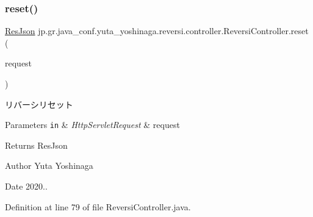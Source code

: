 \subsubsection{\texorpdfstring{reset()}{reset()}}
{\footnotesize\ttfamily \hyperlink{classjp_1_1gr_1_1java__conf_1_1yuta__yoshinaga_1_1reversi_1_1model_1_1_res_json}{Res\+Json} jp.\+gr.\+java\+\_\+conf.\+yuta\+\_\+yoshinaga.\+reversi.\+controller.\+Reversi\+Controller.\+reset (\begin{DoxyParamCaption}\item[{Http\+Servlet\+Request}]{request }\end{DoxyParamCaption})}



リバーシリセット 


\begin{DoxyParams}[1]{Parameters}
\mbox{\tt in}  & {\em Http\+Servlet\+Request} & request \\
\hline
\end{DoxyParams}
\begin{DoxyReturn}{Returns}
Res\+Json 
\end{DoxyReturn}
\begin{DoxyAuthor}{Author}
Yuta Yoshinaga 
\end{DoxyAuthor}
\begin{DoxyDate}{Date}
2020.. 
\end{DoxyDate}


Definition at line 79 of file Reversi\+Controller.\+java.

